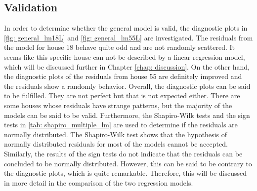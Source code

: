 \subsection{Validation}
In order to determine whether the general model is valid, the diagnostic plots in \cref{fig: general_lm18L} and \cref{fig: general_lm55L} are investigated. The residuals from the model for house 18 behave quite odd and are not randomly scattered. It seems like this specific house can not be described by a linear regression model, which will be discussed further in Chapter \ref{chap: discussion}. On the other hand, the diagnostic plots of the residuals from house 55 are definitely improved and the residuals show a randomly behavior. Overall, the diagnostic plots can be said to be fulfilled. They are not perfect but that is not expected either. There are some houses whose residuals have strange patterns, but the majority of the models can be said to be valid. Furthermore, the Shapiro-Wilk tests and the sign tests in \cref{tab: shapiro_multiple_lm} are used to determine if the residuals are normally distributed. The Shapiro-Wilk test shows that the hypothesis of normally distributed residuals for most of the models cannot be accepted. Similarly, the results of the sign tests do not indicate that the residuals can be concluded to be normally distributed. However, this can be said to be contrary to the diagnostic plots, which is quite remarkable. Therefore, this will be discussed in more detail in the comparison of the two regression models.

